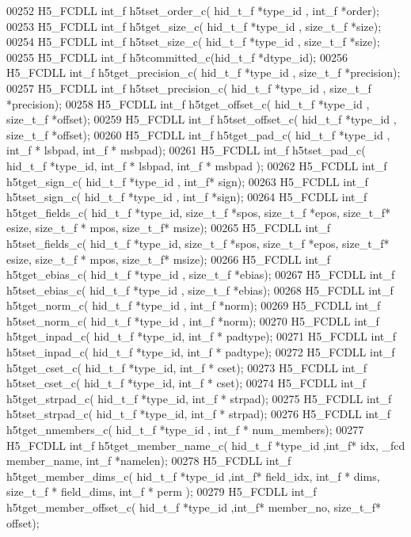 \begin{DoxyCode}
00252 H5\_FCDLL int\_f h5tset\_order\_c( hid\_t\_f *type\_id , int\_f *order);
00253 H5\_FCDLL int\_f h5tget\_size\_c( hid\_t\_f *type\_id , size\_t\_f *size);
00254 H5\_FCDLL int\_f h5tset\_size\_c( hid\_t\_f *type\_id , size\_t\_f *size);
00255 H5\_FCDLL int\_f h5tcommitted\_c(hid\_t\_f *dtype\_id);
00256 H5\_FCDLL int\_f h5tget\_precision\_c( hid\_t\_f *type\_id , size\_t\_f *precision);
00257 H5\_FCDLL int\_f h5tset\_precision\_c( hid\_t\_f *type\_id , size\_t\_f *precision);
00258 H5\_FCDLL int\_f h5tget\_offset\_c( hid\_t\_f *type\_id , size\_t\_f *offset);
00259 H5\_FCDLL int\_f h5tset\_offset\_c( hid\_t\_f *type\_id , size\_t\_f *offset);
00260 H5\_FCDLL int\_f h5tget\_pad\_c( hid\_t\_f *type\_id , int\_f * lsbpad, int\_f * msbpad);
00261 H5\_FCDLL int\_f h5tset\_pad\_c( hid\_t\_f *type\_id, int\_f * lsbpad, int\_f * msbpad );
00262 H5\_FCDLL int\_f h5tget\_sign\_c( hid\_t\_f *type\_id , int\_f* sign);
00263 H5\_FCDLL int\_f h5tset\_sign\_c( hid\_t\_f *type\_id , int\_f *sign);
00264 H5\_FCDLL int\_f h5tget\_fields\_c( hid\_t\_f *type\_id, size\_t\_f *spos, size\_t\_f *epos, size\_t\_f* esize, size\_t\_f
      * mpos, size\_t\_f* msize);
00265 H5\_FCDLL int\_f h5tset\_fields\_c( hid\_t\_f *type\_id, size\_t\_f *spos, size\_t\_f *epos, size\_t\_f* esize, size\_t\_f
      * mpos, size\_t\_f* msize);
00266 H5\_FCDLL int\_f h5tget\_ebias\_c( hid\_t\_f *type\_id , size\_t\_f *ebias);
00267 H5\_FCDLL int\_f h5tset\_ebias\_c( hid\_t\_f *type\_id , size\_t\_f *ebias);
00268 H5\_FCDLL int\_f h5tget\_norm\_c( hid\_t\_f *type\_id , int\_f *norm);
00269 H5\_FCDLL int\_f h5tset\_norm\_c( hid\_t\_f *type\_id , int\_f *norm);
00270 H5\_FCDLL int\_f h5tget\_inpad\_c( hid\_t\_f *type\_id, int\_f * padtype);
00271 H5\_FCDLL int\_f h5tset\_inpad\_c( hid\_t\_f *type\_id, int\_f * padtype);
00272 H5\_FCDLL int\_f h5tget\_cset\_c( hid\_t\_f *type\_id, int\_f * cset);
00273 H5\_FCDLL int\_f h5tset\_cset\_c( hid\_t\_f *type\_id, int\_f * cset);
00274 H5\_FCDLL int\_f h5tget\_strpad\_c( hid\_t\_f *type\_id, int\_f * strpad);
00275 H5\_FCDLL int\_f h5tset\_strpad\_c( hid\_t\_f *type\_id, int\_f * strpad);
00276 H5\_FCDLL int\_f h5tget\_nmembers\_c( hid\_t\_f *type\_id , int\_f * num\_members);
00277 H5\_FCDLL int\_f h5tget\_member\_name\_c( hid\_t\_f *type\_id ,int\_f* idx, \_fcd member\_name, int\_f *namelen);
00278 H5\_FCDLL int\_f h5tget\_member\_dims\_c( hid\_t\_f *type\_id ,int\_f* field\_idx, int\_f * dims, size\_t\_f * 
      field\_dims, int\_f * perm );
00279 H5\_FCDLL int\_f h5tget\_member\_offset\_c( hid\_t\_f *type\_id ,int\_f* member\_no, size\_t\_f* offset);

\end{DoxyCode}

